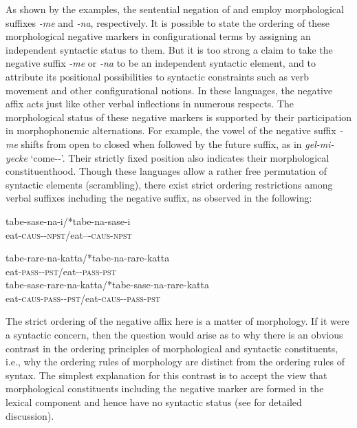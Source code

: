 \documentclass[output=paper
 	        ,biblatex
                ,babelshorthands
                ,newtxmath
                ,draftmode
                ,colorlinks, citecolor=brown
]{langscibook}
\begin{document}
\begin{exe}
\begin{xlist}
\begin{exe}
\begin{xlist}
\noindent
As shown by the examples, the sentential negation of  and  employ
morphological suffixes \textit{-me} and \textit{-na}, respectively.  It is possible to state the
ordering of these morphological negative markers in configurational terms by assigning an
independent syntactic status to them.  But it is too strong a claim to take the negative suffix
\textit{-me} or \textit{-na} to be an independent syntactic element, and to attribute its positional
possibilities to syntactic constraints such as verb movement and other configurational notions.  In
these languages, the negative affix acts just like other verbal inflections in numerous respects.
The morphological status of these negative markers is supported by their participation in
morphophonemic alternations.  For example, the vowel of the  negative suffix
\textit{-me} shifts from open to closed when followed by the future suffix, as in
\textit{gel-mi-yecke} `come-\NEG-\FUT'.  Their strictly fixed position also indicates their
morphological constituenthood. Though these languages allow a rather free permutation of syntactic
elements (scrambling), there exist strict ordering restrictions among verbal suffixes including the
negative suffix, as observed in the following:

\eal
\ex
\gll tabe-sase-na-i/*tabe-na-sase-i \\
     eat-\textsc{caus}-\NEG-\textsc{npst}/eat--\NEG-\textsc{caus}-\textsc{npst} \\\hfill{}

\ex
\gll tabe-rare-na-katta/*tabe-na-rare-katta \\
     eat-\textsc{pass}-\NEG-\textsc{pst}/eat-\NEG-\textsc{pass}-\textsc{pst} \\

\ex
\gll tabe-sase-rare-na-katta/*tabe-sase-na-rare-katta \\
     eat-\textsc{caus}-\textsc{pass}-\NEG-\textsc{pst}/eat-\textsc{caus}-\NEG-\textsc{pass}-\textsc{pst}\\
\zl

\noindent
The strict ordering of the negative affix here is a matter of morphology.
If it were a syntactic concern, then
the question would arise as to why
there is an obvious contrast in the ordering principles
of morphological and syntactic constituents, i.e., why the ordering
rules of morphology are distinct from the ordering rules of syntax. The
simplest explanation for this contrast is to accept
the view that morphological constituents including the negative marker
are formed in the lexical component and hence have no syntactic
status (see \citealt[Chapter~2]{Kim:00} for detailed discussion).


\end{xlist}
\end{exe}
\end{xlist}
\end{exe}
\end{document}

